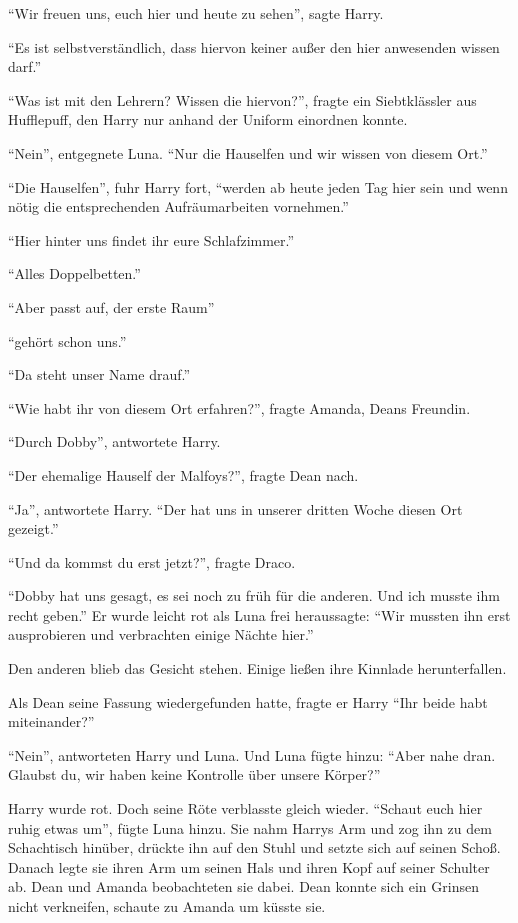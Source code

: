 \enquote{Wir freuen uns, euch hier und heute zu sehen}, sagte Harry.

\enquote{Es ist selbstverständlich, dass hiervon keiner außer den hier anwesenden wissen darf.}

\enquote{Was ist mit den Lehrern? Wissen die hiervon?}, fragte ein Siebtklässler aus Hufflepuff, den Harry nur anhand der Uniform einordnen konnte.

\enquote{Nein}, entgegnete Luna. \enquote{Nur die Hauselfen und wir wissen von diesem Ort.}

\enquote{Die Hauselfen}, fuhr Harry fort, \enquote{werden ab heute jeden Tag hier sein und wenn nötig die entsprechenden Aufräumarbeiten vornehmen.}

\enquote{Hier hinter uns findet ihr eure Schlafzimmer.}

\enquote{Alles Doppelbetten.}

\enquote{Aber passt auf, der erste Raum\abs}

\enquote{\aabs gehört schon uns.}

\enquote{Da steht unser Name drauf.}

\enquote{Wie habt ihr von diesem Ort erfahren?}, fragte Amanda, Deans Freundin.

\enquote{Durch Dobby}, antwortete Harry.

\enquote{Der ehemalige Hauself der Malfoys?}, fragte Dean nach.

\enquote{Ja}, antwortete Harry. \enquote{Der hat uns in unserer dritten Woche diesen Ort gezeigt.}

\enquote{Und da kommst du erst jetzt?}, fragte Draco.

\enquote{Dobby hat uns gesagt, es sei noch zu früh für die anderen. Und ich musste ihm recht geben.} Er wurde leicht rot als Luna frei heraussagte: \enquote{Wir mussten ihn erst ausprobieren und verbrachten einige Nächte hier.}

Den anderen blieb das Gesicht stehen. Einige ließen ihre Kinnlade herunterfallen.

Als Dean seine Fassung wiedergefunden hatte, fragte er Harry \enquote{Ihr beide habt miteinander?}

\enquote{Nein}, antworteten Harry und Luna. Und Luna fügte hinzu: \enquote{Aber nahe dran. Glaubst du, wir haben keine Kontrolle über unsere Körper?}

Harry wurde rot. Doch seine Röte verblasste gleich wieder. \enquote{Schaut euch hier ruhig etwas um}, fügte Luna hinzu. Sie nahm Harrys Arm und zog ihn zu dem Schachtisch hinüber, drückte ihn auf den Stuhl und setzte sich auf seinen Schoß. Danach legte sie ihren Arm um seinen Hals und ihren Kopf auf seiner Schulter ab. Dean und Amanda beobachteten sie dabei. Dean konnte sich ein Grinsen nicht verkneifen, schaute zu Amanda um küsste sie.


